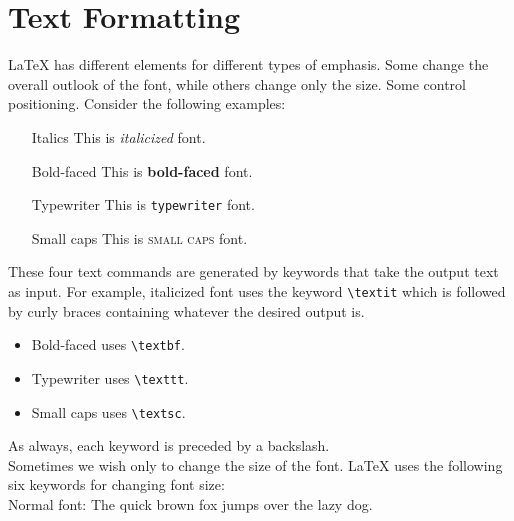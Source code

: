 \documentclass[11pt]{article}
\begin{document}
\section{Text Formatting}
LaTeX has different elements for different types of emphasis. Some change the overall outlook of the font, while others change only the size. Some control positioning. Consider the following examples: 

\begin{itemize}
	\item[Italics] This is \textit{italicized} font.
	\item[Bold-faced] This is \textbf{bold-faced} font.
	\item[Typewriter] This is \texttt{typewriter} font.
	\item[Small caps] This is \textsc{small caps} font.
\end{itemize}

These four text commands are generated by keywords that take the output text as input. For example, italicized font uses the keyword \texttt{\textbackslash textit} which is followed by curly braces containing whatever the desired output is. 

\begin{itemize}
	\item Bold-faced uses \texttt{\textbackslash textbf}.
	\item Typewriter uses \texttt{\textbackslash texttt}.
	\item Small caps uses \texttt{\textbackslash textsc}.	
\end{itemize}

As always, each keyword is preceded by a backslash. \\
Sometimes we wish only to change the size of the font. LaTeX uses the following six keywords for changing font size: 
\\

Normal font: The quick brown fox jumps over the lazy dog.
\end{document}
